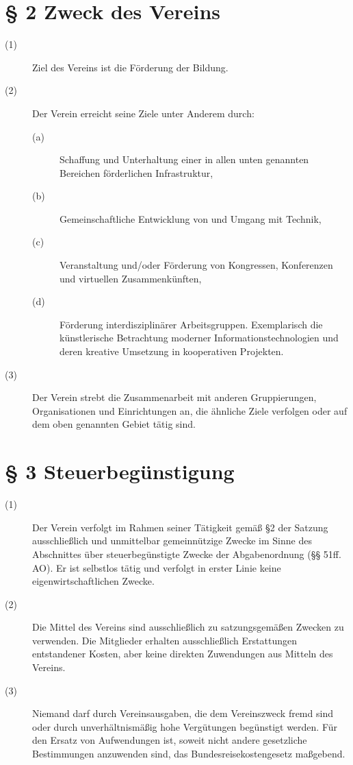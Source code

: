 \documentclass[a4paper,12pt]{scrartcl}
\begin{document}
\section*{\S{} 2 Zweck des Vereins}
\begin{description} 

\item[(1)] Ziel des Vereins ist die Förderung der Bildung.
\item[(2)] Der Verein erreicht seine Ziele unter Anderem durch:
\begin{description}
 \item[(a)] Schaffung und Unterhaltung einer in allen unten genannten Bereichen förderlichen Infrastruktur,
 \item[(b)] Gemeinschaftliche Entwicklung von und Umgang mit Technik,
 \item[(c)] Veranstaltung und/oder Förderung von Kongressen, Konferenzen und virtuellen Zusammenkünften,
 \item[(d)] Förderung interdisziplinärer Arbeitsgruppen. Exemplarisch die künstlerische Betrachtung moderner Informationstechnologien und deren kreative Umsetzung in kooperativen Projekten.
\end{description}
\item[(3)] Der Verein strebt die Zusammenarbeit mit anderen Gruppierungen, Organisationen und Einrichtungen an, die ähnliche Ziele verfolgen oder auf dem oben genannten Gebiet tätig sind.
 
\end{description}



\section*{\S{} 3 Steuerbegünstigung}
\begin{description} 

\item[(1)] Der Verein verfolgt im Rahmen seiner Tätigkeit gemäß §2 der Satzung ausschließlich und unmittelbar gemeinnützige Zwecke im Sinne des Abschnittes über steuerbegünstigte Zwecke der Abgabenordnung (§§ 51ff. AO). Er ist selbstlos tätig und verfolgt in erster Linie keine eigenwirtschaftlichen Zwecke.

\item[(2)] Die Mittel des Vereins sind ausschließlich zu satzungsgemäßen Zwecken zu verwenden. Die Mitglieder erhalten ausschließlich Erstattungen entstandener Kosten, aber keine direkten Zuwendungen aus Mitteln des Vereins.

\item[(3)] Niemand darf durch Vereinsausgaben, die dem Vereinszweck fremd sind oder durch unverhältnismäßig hohe Vergütungen begünstigt werden. Für den Ersatz von Aufwendungen ist, soweit nicht andere gesetzliche Bestimmungen anzuwenden sind, das Bundesreisekostengesetz maßgebend.

\end{description}
\end{document}
